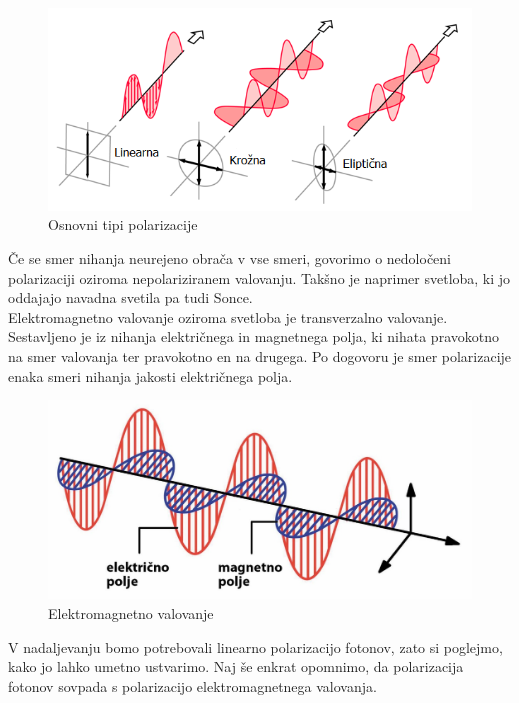 \documentclass[A4paper, 11pt]{article}
\begin{document}
\begin{figure}[h]
\centering
\caption{Osnovni tipi polarizacije}
\includegraphics[scale=0.7]{3}
\end{figure}

\pagebreak

Če se smer nihanja neurejeno obrača v vse smeri, govorimo o nedoločeni polarizaciji oziroma nepolariziranem valovanju. Takšno je naprimer svetloba, ki jo oddajajo navadna svetila pa tudi Sonce. \\

Elektromagnetno valovanje oziroma svetloba je transverzalno valovanje. Sestavljeno je iz nihanja električnega in magnetnega polja, ki nihata pravokotno na smer valovanja ter pravokotno en na drugega. Po dogovoru je smer polarizacije enaka smeri nihanja jakosti električnega polja.

\begin{figure}[h]
\centering
\caption{Elektromagnetno valovanje}
\includegraphics[scale=0.7]{emv}
\end{figure}

V nadaljevanju bomo potrebovali linearno polarizacijo fotonov, zato si poglejmo, kako jo lahko umetno ustvarimo. Naj še enkrat opomnimo, da polarizacija fotonov sovpada s polarizacijo elektromagnetnega valovanja. 
\end{document}

